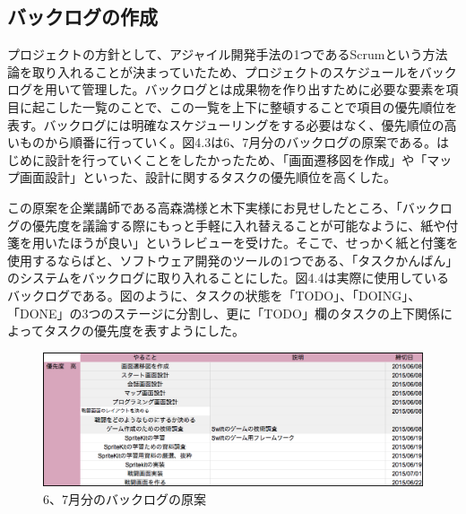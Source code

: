 \documentclass[openany,11pt,papersize]{jsbook}
\begin{document}
\subsection{バックログの作成}
\par プロジェクトの方針として、アジャイル開発手法の1つであるScrumという方法論を取り入れることが決まっていたため、プロジェクトのスケジュールをバックログを用いて管理した。バックログとは成果物を作り出すために必要な要素を項目に起こした一覧のことで、この一覧を上下に整頓することで項目の優先順位を表す。バックログには明確なスケジューリングをする必要はなく、優先順位の高いものから順番に行っていく。図4.3は6、7月分のバックログの原案である。はじめに設計を行っていくことをしたかったため、「画面遷移図を作成」や「マップ画面設計」といった、設計に関するタスクの優先順位を高くした。

\par この原案を企業講師である高森満様と木下実様にお見せしたところ、「バックログの優先度を議論する際にもっと手軽に入れ替えることが可能なように、紙や付箋を用いたほうが良い」というレビューを受けた。そこで、せっかく紙と付箋を使用するならばと、ソフトウェア開発のツールの1つである、「タスクかんばん」のシステムをバックログに取り入れることにした。図4.4は実際に使用しているバックログである。図のように、タスクの状態を「TODO」、「DOING」、「DONE」の3つのステージに分割し、更に「TODO」欄のタスクの上下関係によってタスクの優先度を表すようにした。

\begin{figure}[H]
\begin{center}
\includegraphics[width=14cm, bb=0 0 1020 359]{img/SprintBacklog.png}
\end{center}
\caption{6、7月分のバックログの原案}
\end{figure}
\end{document}
